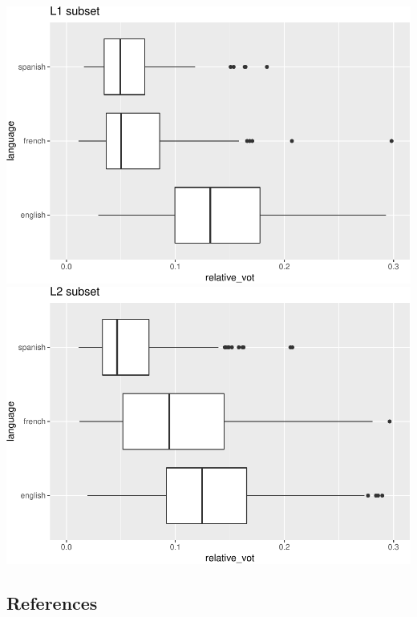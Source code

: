 \documentclass[
  12pt,
]{article}
\begin{document}
\includegraphics[width=0.5\linewidth]{abstract_files/figure-latex/figures-side-1}
\includegraphics[width=0.5\linewidth]{abstract_files/figure-latex/figures-side-2}

\hypertarget{references}{%
\subsection{References}\label{references}}

\begingroup
\setlength{\parindent}{-0.5in}
\setlength{\leftskip}{0.5in}
\phantom{.}

\textcolor{white}{\\} \vspace{-0.5in}
\end{document}
